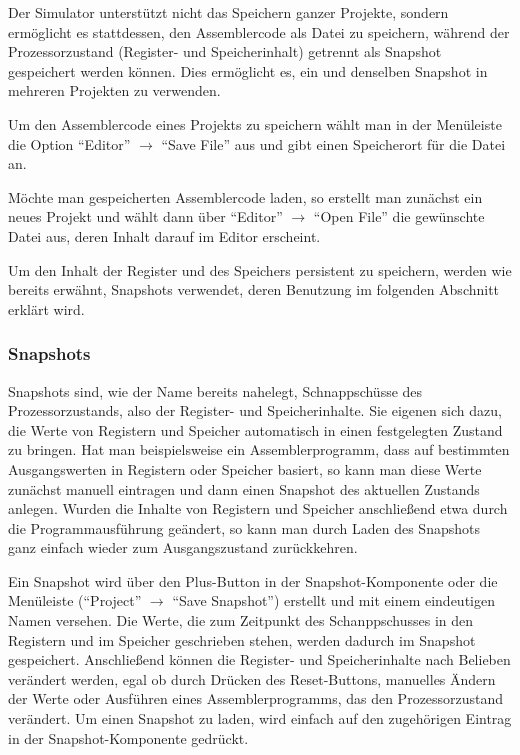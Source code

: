 Der Simulator unterstützt nicht das Speichern ganzer Projekte, sondern ermöglicht es stattdessen, den Assemblercode als Datei zu speichern, während der Prozessorzustand (Register- und Speicherinhalt) getrennt als Snapshot gespeichert werden können. Dies ermöglicht es, ein und denselben Snapshot in mehreren Projekten zu verwenden.

Um den Assemblercode eines Projekts zu speichern wählt man in der Menüleiste die Option ``Editor'' $\rightarrow$ ``Save File'' aus und gibt einen Speicherort für die Datei an.

Möchte man gespeicherten Assemblercode laden, so erstellt man zunächst ein neues Projekt und wählt dann über ``Editor'' $\rightarrow$ ``Open File'' die gewünschte Datei aus, deren Inhalt darauf im Editor erscheint.

Um den Inhalt der Register und des Speichers persistent zu speichern, werden wie bereits erwähnt, Snapshots verwendet, deren Benutzung im folgenden Abschnitt erklärt wird.

\subsubsection{Snapshots}

Snapshots sind, wie der Name bereits nahelegt, Schnappschüsse des Prozessorzustands, also der Register- und Speicherinhalte. Sie eigenen sich dazu, die Werte von Registern und Speicher automatisch in einen festgelegten Zustand zu bringen. Hat man beispielsweise ein Assemblerprogramm, dass auf bestimmten Ausgangswerten in Registern oder Speicher basiert, so kann man diese Werte zunächst manuell eintragen und dann einen Snapshot des aktuellen Zustands anlegen. Wurden die Inhalte von Registern und Speicher anschließend etwa durch die Programmausführung geändert, so kann man durch Laden des Snapshots ganz einfach wieder zum Ausgangszustand zurückkehren.

Ein Snapshot wird über den Plus-Button in der Snapshot-Komponente oder die Menüleiste (``Project'' $\rightarrow$ ``Save Snapshot'') erstellt und mit einem eindeutigen Namen versehen. Die Werte, die zum Zeitpunkt des Schanppschusses in den Registern und im Speicher geschrieben stehen, werden dadurch im Snapshot gespeichert. Anschließend können die Register- und Speicherinhalte nach Belieben verändert werden, egal ob durch Drücken des Reset-Buttons, manuelles Ändern der Werte oder Ausführen eines Assemblerprogramms, das den Prozessorzustand verändert. Um einen Snapshot zu laden, wird einfach auf den zugehörigen Eintrag in der Snapshot-Komponente gedrückt.

